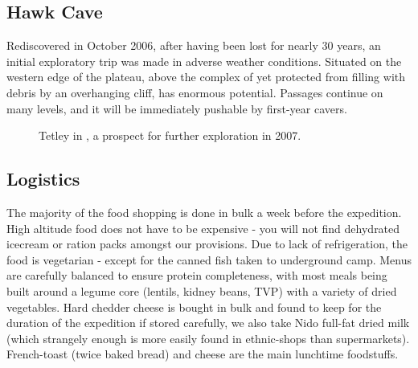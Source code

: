 \subsection{Hawk Cave}

Rediscovered in October 2006, after having been lost for nearly 30 years, an initial exploratory trip was made in adverse weather conditions. Situated on the western edge of the plateau, above the complex of  yet protected from filling with debris by an overhanging cliff,  has enormous potential. Passages continue on many levels, and it will be immediately pushable by first-year cavers.

\begin{figure}[t!]
\checkoddpage \ifoddpage \forcerectofloat \else \forceversofloat \fi
{}
\caption{Tetley in \protect{}, a prospect for further exploration in 2007. }
\end{figure}

\subsection{Logistics}

The majority of the food shopping is done in bulk a week before the expedition. High altitude food does not have to be expensive - you will not find dehydrated icecream or ration packs amongst our provisions. Due to lack of refrigeration, the food is vegetarian - except for the canned fish taken to underground camp. Menus are carefully balanced to ensure protein completeness, with most meals being built around a legume core (lentils, kidney beans, TVP) with a variety of dried vegetables. Hard chedder cheese is bought in bulk and found to keep for the duration of the expedition if stored carefully, we also take Nido full-fat dried milk (which strangely enough is more easily found in ethnic-shops than supermarkets). French-toast (twice baked bread) and cheese are the main lunchtime foodstuffs.

